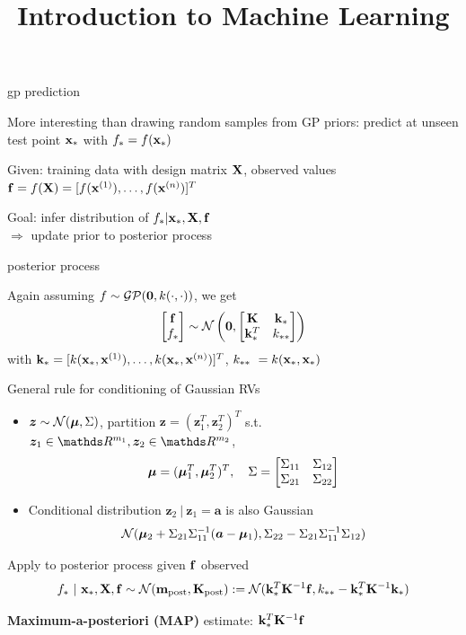 \documentclass[11pt,compress,t,notes=noshow, xcolor=table]{beamer}
\title{Introduction to Machine Learning}
\begin{document}

\begin{framei}[sep=L]{gp prediction}
\item More interesting than drawing random samples from GP priors: predict at unseen test point $\xs$ with $f_\ast = f(\xs)$
\item Given: training data with design matrix $\Xmat$, observed values $\fv = f(\Xmat) = \fvec^T$
\item Goal: infer distribution of $f_\ast | \xs, \Xmat, \fv$ \\$\Rightarrow$ update prior to posterior process
\end{framei}

\begin{framei}[sep=M]{posterior process}
\item Again assuming $f \sim \GPzk$, we get
$$\begin{bmatrix}
\fv \\ f_\ast
\end{bmatrix} \sim  
\normal \left(\zero, \begin{bmatrix} \Kmat & \ks \\ \ks^T & \kss\end{bmatrix}\right)$$
with $\ks = [k(\xs, \xi[1]), \dots, k(\xs, \xi[n])]^T$,  $ \kss\ = k(\xs, \xs)$
\item General rule for conditioning of Gaussian RVs
\begin{itemize}
\item $\bm{z} \sim \normal(\muv, \Sigma)$, partition $\bm{z} = (\bm{z}_1^T, \bm{z}_2^T)^T$ s.t. $\bm{z}_1 \in \R^{m_1}, \bm{z}_2 \in \R^{m_2}$, $$\muv = (\muv_1^T, \muv_2^T)^T, \quad \Sigma = \begin{bmatrix} \Sigma_{11} & \Sigma_{12} \\ \Sigma_{21} & \Sigma_{22} \end{bmatrix} $$
\item Conditional distribution $\bm{z}_2 ~|~ \bm{z}_1 = \bm{a}$ is also Gaussian 
$$\normal(\muv_2 + \Sigma_{21} \Sigma_{11}^{-1} (\bm{a} - \muv_1), \Sigma_{22} - \Sigma_{21}\Sigma_{11}^{-1} \Sigma_{12})$$
\end{itemize}
\item Apply to posterior process given $\fv$ observed $$f_* ~|~ \xs, \Xmat, \fv \sim \normal(\mv_{\text{post}}, \Kmat_\text{post}) := \normal(\ks^{T}\Kinv\fv, \kss - \ks^T \Kmat ^{-1}\ks)$$
\item \textbf{Maximum-a-posteriori (MAP)} estimate: $\ks^{T}\Kinv\fv$
\end{framei}
\end{document}
